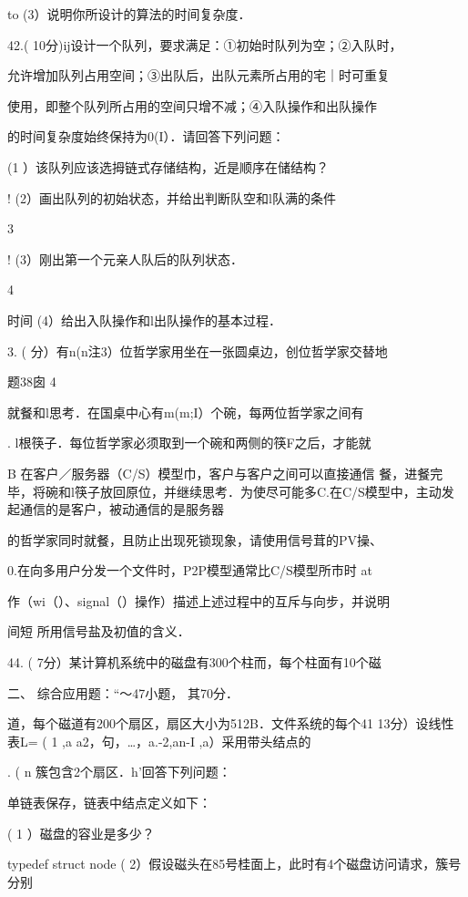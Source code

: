{    to     (3）说明你所设计的算法的时间复杂度．

    42.( 10分)ij设计一个队列，要求满足：①初始时队列为空；②入队时，

    允许增加队列占用空间；③出队后，出队元素所占用的宅｜时可重复

    使用，即整个队列所占用的空间只增不减；④入队操作和出队操作

    的时间复杂度始终保持为0(I）．请回答下列问题：

    (1  ）该队列应该选拇链式存储结构，近是顺序在储结构？

    !    (2）画出队列的初始状态，并给出判断队空和l队满的条件

    3

    !    (3）刚出第一个元亲人队后的队列状态．

    4

    时间    (4）给出入队操作和l出队操作的基本过程．

    3. ( 分）有n(n注3）位哲学家用坐在一张圆桌边，创位哲学家交替地

    题38囱    4

    就餐和l思考．在国桌中心有m(m;I）个碗，每两位哲学家之间有

    .    l根筷子．每位哲学家必须取到一个碗和两侧的筷F之后，才能就

   B 在客户／服务器（C/S）模型巾，客户与客户之间可以直接通信    餐，进餐完毕，将碗和l筷子放回原位，并继续思考．为使尽可能多C.在C/S模型中，主动发起通信的是客户，被动通信的是服务器

    的哲学家同时就餐，且防止出现死锁现象，请使用信号茸的PV操、

   0.在向多用户分发一个文件时，P2P模型通常比C/S模型所市时    at

    作（wi（）、signal（）操作）描述上述过程中的互斥与向步，并说明

   间短    所用信号盐及初值的含义．

    44. ( 7分）某计算机系统中的磁盘有300个柱而，每个柱面有10个磁

    二、  综合应用题：“～47小题， 其70分．

    道，每个磁道有200个扇区，扇区大小为512B．文件系统的每个41  13分）设线性表L= ( 1 ,a  a2，句，…，a.-2,an-I ,a）采用带头结点的

  . (     n    簇包含2个扇区．h'回答下列问题：

   单链表保存，链表中结点定义如下：

    ( 1 ）磁盘的容业是多少？

   typedef struct node    ( 2）假设磁头在85号桂面上，此时有4个磁盘访问请求，簇号分别

}
